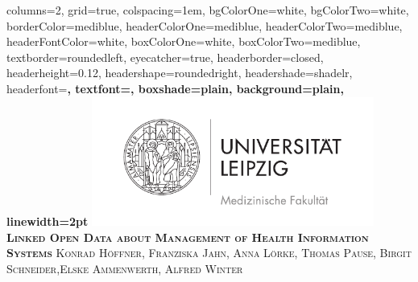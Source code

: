 \documentclass[portrait,final,a0paper,fontscale=0.310]{baposter}
\begin{document}


\begin{poster}%
  {
  columns=2,
  grid=true,
  colspacing=1em,
  bgColorOne=white,
  bgColorTwo=white,
  borderColor=mediblue,
  headerColorOne=mediblue,
  headerColorTwo=mediblue,
  headerFontColor=white,
  boxColorOne=white,
  boxColorTwo=mediblue,
  textborder=roundedleft,
  eyecatcher=true,
  headerborder=closed,
  headerheight=0.12\textheight,
  headershape=roundedright,
  headershade=shadelr,
  headerfont=\Large\bf\textsc, %
  textfont={\setlength{\parindent}{1.5em}},
  boxshade=plain,
  background=plain,
  linewidth=2pt
  }
  {\includegraphics[width=25em]{img/medfak.pdf}} 
  {\bf\textsc{Linked Open Data about Management of Health Information Systems}\vspace{0.5em}
  }
  {\textsc{Konrad Höffner, Franziska Jahn, Anna Lörke, Thomas Pause, Birgit Schneider,Elske
  Ammenwerth, Alfred Winter}}
  {%
  }


\end{poster}
\end{document}
